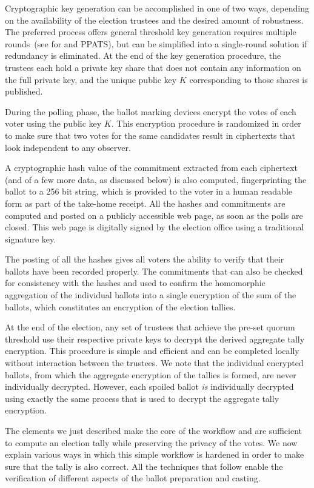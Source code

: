 Cryptographic key generation can be accomplished in one of two ways,
depending on the availability of the election trustees and the desired
amount of robustness. The preferred process offers general threshold
key generation requires multiple rounds~(see \cite{GJKR07} for
\elgamal and PPATS), but can be simplified into a single-round
solution if redundancy is eliminated.  At the end of the key
generation procedure, the trustees each hold a private key share that
does not contain any information on the full private key, and the
unique public key $K$ corresponding to those shares is published.

During the polling phase, the ballot marking devices encrypt the votes
of each voter using the public key $K$. This encryption procedure is
randomized in order to make sure that two votes for the same
candidates result in ciphertexts that look independent to any
observer. 

A cryptographic hash value of the commitment extracted from each
ciphertext (and of a few more data, as discussed below) is also
computed, fingerprinting the ballot to a 256 bit string, which is
provided to the voter in a human readable form as part of the
take-home receipt. All the hashes and commitments are computed and
posted on a publicly accessible web page, as soon as the polls are
closed. This web page is digitally signed by the election office using
a traditional signature key.

The posting of all the hashes gives all voters the ability to verify
that their ballots have been recorded properly.  The commitments that
can also be checked for consistency with the hashes and used to
confirm the homomorphic aggregation of the individual ballots into a
single encryption of the sum of the ballots, which constitutes an
encryption of the election tallies.

At the end of the election, any set of trustees that achieve the
pre-set quorum threshold use their respective private keys to decrypt
the derived aggregate tally encryption.  This procedure is simple and
efficient and can be completed locally without interaction between the
trustees.  We note that the individual encrypted ballots, from which
the aggregate encryption of the tallies is formed, are never
individually decrypted.  However, each spoiled ballot {\em is}
individually decrypted using exactly the same process that is used to
decrypt the aggregate tally encryption.

The elements we just described make the core of the workflow and are
sufficient to compute an election tally while preserving the privacy
of the votes. We now explain various ways in which this simple
workflow is hardened in order to make sure that the tally is also
correct. All the techniques that follow enable the verification of
different aspects of the ballot preparation and casting.

